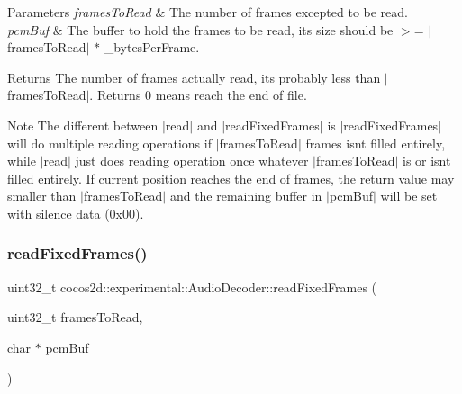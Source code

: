 \begin{DoxyParams}{Parameters}
{\em frames\+To\+Read} & The number of frames excepted to be read. \\
\hline
{\em pcm\+Buf} & The buffer to hold the frames to be read, its size should be $>$= $\vert$frames\+To\+Read$\vert$ $\ast$ \+\_\+bytes\+Per\+Frame. \\
\hline
\end{DoxyParams}
\begin{DoxyReturn}{Returns}
The number of frames actually read, it\textquotesingle{}s probably less than $\vert$frames\+To\+Read$\vert$. Returns 0 means reach the end of file. 
\end{DoxyReturn}
\begin{DoxyNote}{Note}
The different between $\vert$read$\vert$ and $\vert$read\+Fixed\+Frames$\vert$ is $\vert$read\+Fixed\+Frames$\vert$ will do multiple reading operations if $\vert$frames\+To\+Read$\vert$ frames isn\textquotesingle{}t filled entirely, while $\vert$read$\vert$ just does reading operation once whatever $\vert$frames\+To\+Read$\vert$ is or isn\textquotesingle{}t filled entirely. If current position reaches the end of frames, the return value may smaller than $\vert$frames\+To\+Read$\vert$ and the remaining buffer in $\vert$pcm\+Buf$\vert$ will be set with silence data (0x00). 
\end{DoxyNote}
\mbox{\label{classcocos2d_1_1experimental_1_1AudioDecoder_a55fbd14ff185cdf67fd9fe6674bde473}} 
\subsubsection{\texorpdfstring{read\+Fixed\+Frames()}{readFixedFrames()}\hspace{0.1cm}{\footnotesize\ttfamily [2/2]}}
{\footnotesize\ttfamily uint32\+\_\+t cocos2d\+::experimental\+::\+Audio\+Decoder\+::read\+Fixed\+Frames (\begin{DoxyParamCaption}\item[{uint32\+\_\+t}]{frames\+To\+Read,  }\item[{char $\ast$}]{pcm\+Buf }\end{DoxyParamCaption})}



